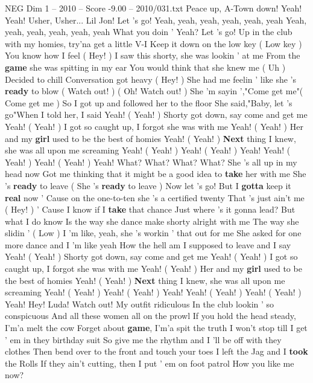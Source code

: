 \begin{textsample}{NEG Dim 1 – 2010 – Score -9.00 – 2010/031.txt}  \label{ex:f1_neg_030}
Peace up, A-Town down!
Yeah!
Yeah!
Usher, Usher...
Lil Jon!
Let 's go!
Yeah, yeah, yeah, yeah, yeah, yeah Yeah, yeah, yeah, yeah, yeah, yeah What you doin ' Yeah?
Let 's go!
Up in the club with my homies, try'na get a little V-I Keep it down on the low key ( Low key ) You know how I feel ( Hey! ) I saw this shorty, she was lookin ' at me From the \textbf{game} she was spitting in my ear You would think that she knew me ( Uh ) Decided to chill Conversation got heavy ( Hey! ) She had me feelin ' like she 's \textbf{ready} to blow ( Watch out! ) ( Oh!
Watch out! ) She 'm sayin ',"Come get me"( Come get me ) So I got up and followed her to the floor She said,"Baby, let 's go"When I told her, I said Yeah! ( Yeah! ) Shorty got down, say come and get me Yeah! ( Yeah! ) I got so caught up, I forgot she was with me Yeah! ( Yeah! ) Her and my \textbf{girl} used to be the best of homies Yeah! ( Yeah! ) \textbf{Next} thing I knew, she was all upon me screaming Yeah! ( Yeah! ) Yeah! ( Yeah! ) Yeah!
Yeah! ( Yeah! ) Yeah! ( Yeah! ) Yeah!
What?
What?
What?
What?
She 's all up in my head now Got me thinking that it might be a good idea to \textbf{take} her with me She 's \textbf{ready} to leave ( She 's \textbf{ready} to leave ) Now let 's go!
But I \textbf{gotta} keep it \textbf{real} now ' Cause on the one-to-ten she 's a certified twenty That 's just ain't me ( Hey! ) ' Cause I know if I \textbf{take} that chance Just where 's it gonna lead?
But what I do know Is the way she dance make shorty alright with me The way she slidin ' ( Low ) I 'm like, yeah, she 's workin ' that out for me She asked for one more dance and I 'm like yeah How the hell am I supposed to leave and I say Yeah! ( Yeah! ) Shorty got down, say come and get me Yeah! ( Yeah! ) I got so caught up, I forgot she was with me Yeah! ( Yeah! ) Her and my \textbf{girl} used to be the best of homies Yeah! ( Yeah! ) \textbf{Next} thing I knew, she was all upon me screaming Yeah! ( Yeah! ) Yeah! ( Yeah! ) Yeah!
Yeah! ( Yeah! ) Yeah! ( Yeah! ) Yeah!
Hey!
Luda!
Watch out!
My outfit ridiculous In the club lookin ' so conspicuous And all these women all on the prowl If you hold the head steady, I'm'a melt the cow Forget about \textbf{game}, I'm'a spit the truth I won't stop till I get ' em in they birthday suit So give me the rhythm and I 'll be off with they clothes Then bend over to the front and touch your toes I left the Jag and I \textbf{took} the Rolls If they ain't cutting, then I put ' em on foot patrol How you like me now?

\end{textsample}
